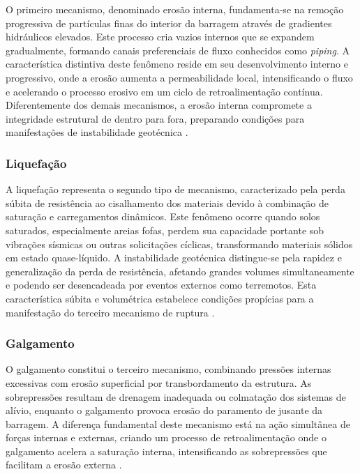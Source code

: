 O primeiro mecanismo, denominado erosão interna, fundamenta-se na remoção progressiva de partículas finas do interior da barragem através de gradientes hidráulicos elevados. Este processo cria vazios internos que se expandem gradualmente, formando canais preferenciais de fluxo conhecidos como \textit{piping}. A característica distintiva deste fenômeno reside em seu desenvolvimento interno e progressivo, onde a erosão aumenta a permeabilidade local, intensificando o fluxo e acelerando o processo erosivo em um ciclo de retroalimentação contínua. Diferentemente dos demais mecanismos, a erosão interna compromete a integridade estrutural de dentro para fora, preparando condições para manifestações de instabilidade geotécnica \cite{arnez1999avaliacao}.

\subsubsection{Liquefação}

A liquefação representa o segundo tipo de mecanismo, caracterizado pela perda súbita de resistência ao cisalhamento dos materiais devido à combinação de saturação e carregamentos dinâmicos. Este fenômeno ocorre quando solos saturados, especialmente areias fofas, perdem sua capacidade portante sob vibrações sísmicas ou outras solicitações cíclicas, transformando materiais sólidos em estado quase-líquido. A instabilidade geotécnica distingue-se pela rapidez e generalização da perda de resistência, afetando grandes volumes simultaneamente e podendo ser desencadeada por eventos externos como terremotos. Esta característica súbita e volumétrica estabelece condições propícias para a manifestação do terceiro mecanismo de ruptura \cite{arnez1999avaliacao}.

\subsubsection{Galgamento}

O galgamento constitui o terceiro mecanismo, combinando pressões internas excessivas com erosão superficial por transbordamento da estrutura. As sobrepressões resultam de drenagem inadequada ou colmatação dos sistemas de alívio, enquanto o galgamento provoca erosão do paramento de jusante da barragem. A diferença fundamental deste mecanismo está na ação simultânea de forças internas e externas, criando um processo de retroalimentação onde o galgamento acelera a saturação interna, intensificando as sobrepressões que facilitam a erosão externa \cite{arnez1999avaliacao}.

